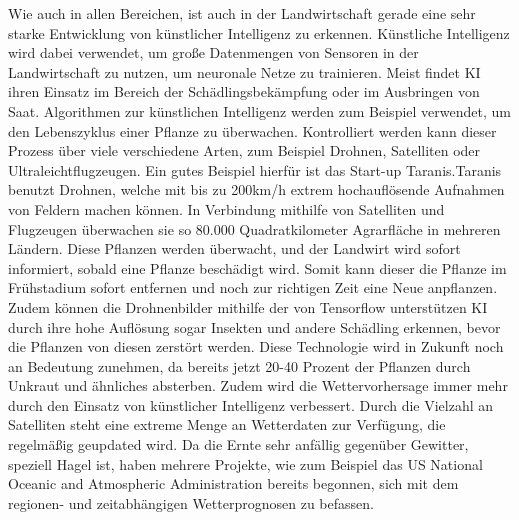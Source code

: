 Wie auch in allen Bereichen, ist auch in der Landwirtschaft gerade eine sehr
starke Entwicklung von künstlicher Intelligenz zu erkennen. Künstliche
Intelligenz wird dabei verwendet, um große Datenmengen von Sensoren in der
Landwirtschaft zu nutzen, um neuronale Netze zu trainieren. Meist findet KI
ihren Einsatz im Bereich der Schädlingsbekämpfung oder im Ausbringen von
Saat.\cite{mci/Mohr2020} Algorithmen zur künstlichen Intelligenz werden zum
Beispiel verwendet, um den Lebenszyklus einer Pflanze zu überwachen.
Kontrolliert werden kann dieser Prozess über viele verschiedene Arten, zum
Beispiel Drohnen, Satelliten oder Ultraleichtflugzeugen. Ein gutes Beispiel
hierfür ist das Start-up Taranis.Taranis benutzt Drohnen, welche mit bis zu
200km/h extrem hochauflösende Aufnahmen von Feldern machen können. In
Verbindung mithilfe von Satelliten und Flugzeugen überwachen sie so 80.000
Quadratkilometer Agrarfläche in mehreren Ländern. Diese Pflanzen werden
überwacht, und der Landwirt wird sofort informiert, sobald eine Pflanze
beschädigt wird. Somit kann dieser die Pflanze im Frühstadium sofort entfernen
und noch zur richtigen Zeit eine Neue anpflanzen. Zudem können die
Drohnenbilder mithilfe der von Tensorflow unterstützen KI durch ihre hohe
Auflösung sogar Insekten und andere Schädling erkennen, bevor die Pflanzen von
diesen zerstört werden. Diese Technologie wird in Zukunft noch an Bedeutung
zunehmen, da bereits jetzt 20-40 Prozent der Pflanzen durch Unkraut und
ähnliches absterben. Zudem wird die Wettervorhersage immer mehr durch den
Einsatz von künstlicher Intelligenz verbessert. Durch die Vielzahl an
Satelliten steht eine extreme Menge an Wetterdaten zur Verfügung, die
regelmäßig geupdated wird. Da die Ernte sehr anfällig gegenüber Gewitter,
speziell Hagel ist, haben mehrere Projekte, wie zum Beispiel das US National
Oceanic and Atmospheric Administration bereits begonnen, sich mit dem regionen-
und zeitabhängigen Wetterprognosen zu befassen.\cite{wennker2020kunstliche}